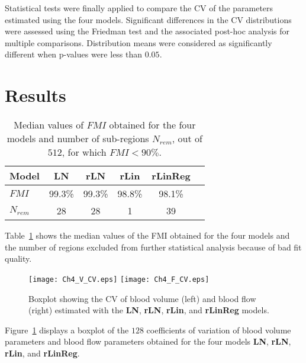 Statistical tests were finally applied to compare the CV of the parameters estimated using the four models.
Significant differences in the CV distributions were assessed using the Friedman test and the associated post-hoc analysis for multiple comparisons.  
Distribution means were considered as significantly different when p-values were less than $0.05$.

\section{Results}
\begin{table}[bth]
\begin{center}
\begin{tabular}{lccccc}
\toprule
Model & \textbf{LN} & \textbf{rLN} &\textbf{rLin} & \textbf{rLinReg} \\
\midrule
$FMI$ & 99.3\% & 99.3\%  & 98.8\%  & 98.1\%  \\
$N_{rem}$ & 28  &  28 & 1 & 39 \\
\bottomrule
\end{tabular}
\caption{Median values of $FMI$ obtained for the four models and number of sub-regions $N_{rem}$, out of $512$, for which $FMI <90\%$.}
\label{tab:FMI}
\end{center}
\end{table}

Table~\ref{tab:FMI} shows the median values of the FMI obtained for the four models and the number of regions excluded from further statistical analysis because of bad fit quality. 

\begin{figure}[bth]
  \centering
  \texttt{[image: Ch4\_V\_CV.eps]}
  \texttt{[image: Ch4\_F\_CV.eps]}
  \caption{Boxplot showing the CV of blood volume  (left) and blood flow (right) estimated with the \textbf{LN}, \textbf{rLN}, \textbf{rLin}, and \textbf{rLinReg} models.}
\label{fig:CV}
\end{figure}

Figure~\ref{fig:CV} displays a boxplot of the $128$ coefficients of variation of blood volume parameters and blood flow parameters obtained for the four models \textbf{LN}, \textbf{rLN}, \textbf{rLin}, and \textbf{rLinReg}. 

